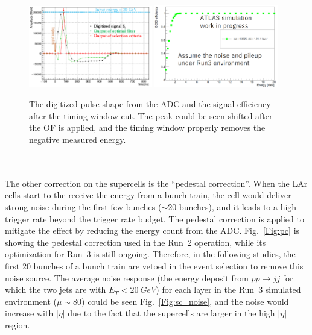 \begin{figure}[!h]                
	\includegraphics[width=0.48\textwidth]{Chapter6/Pulse.png}
	\includegraphics[width=0.48\textwidth]{Chapter6/TimeWindow.png}
	\begin{center}
		\caption{The digitized pulse shape from the ADC and the signal efficiency after the timing window cut. The peak could be seen shifted after the OF is applied, and the timing window properly removes the negative measured energy. }
		\label{Fig:OFC}            
	\end{center}
\end{figure}
\noindent
\\
\\The other correction on the supercells is the ``pedestal correction''. When the LAr cells start to the receive the energy from a bunch train, the cell would deliver strong noise during the first few bunches ($\sim 20$ bunches), and it leads to a high trigger rate beyond the trigger rate budget. The pedestal correction is applied to mitigate the effect by reducing the energy count from the ADC. Fig.~\ref{Fig:pc} is showing the pedestal correction used in the Run~2 operation, while its optimization for Run~3 is still ongoing. Therefore, in the following studies, the first 20 bunches of a bunch train are vetoed in the event selection to remove this noise source. The average noise response (the energy deposit from $pp\to jj$ for which the two jets are with $E_{T}<20~GeV$) for each layer in the Run~3 simulated environment ($\mu\sim80$) could be seen Fig.~\ref{Fig:sc_noise}, and the noise would increase with $|\eta|$ due to the fact that the supercells are larger in the high $|\eta|$ region.
